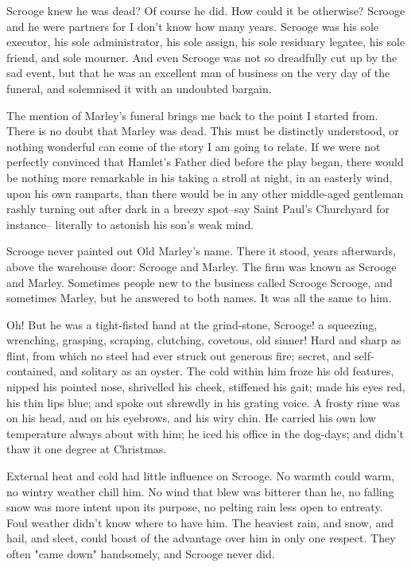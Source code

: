 \documentclass[twocolumn]{article}
\begin{document}
Scrooge knew he was dead? Of course he did.
How could it be otherwise? Scrooge and he were
partners for I don't know how many years. Scrooge
was his sole executor, his sole administrator, his sole
assign, his sole residuary legatee, his sole friend, and
sole mourner. And even Scrooge was not so dreadfully
cut up by the sad event, but that he was an excellent
man of business on the very day of the funeral,
and solemnised it with an undoubted bargain.

The mention of Marley's funeral brings me back to
the point I started from. There is no doubt that Marley
was dead. This must be distinctly understood, or
nothing wonderful can come of the story I am going
to relate. If we were not perfectly convinced that
Hamlet's Father died before the play began, there
would be nothing more remarkable in his taking a
stroll at night, in an easterly wind, upon his own ramparts,
than there would be in any other middle-aged
gentleman rashly turning out after dark in a breezy
spot--say Saint Paul's Churchyard for instance--
literally to astonish his son's weak mind.

Scrooge never painted out Old Marley's name.
There it stood, years afterwards, above the warehouse
door: Scrooge and Marley. The firm was known as
Scrooge and Marley. Sometimes people new to the
business called Scrooge Scrooge, and sometimes Marley,
but he answered to both names. It was all the
same to him.

Oh! But he was a tight-fisted hand at the grind-stone,
Scrooge! a squeezing, wrenching, grasping, scraping,
clutching, covetous, old sinner! Hard and sharp as flint,
from which no steel had ever struck out generous fire;
secret, and self-contained, and solitary as an oyster. The
cold within him froze his old features, nipped his pointed
nose, shrivelled his cheek, stiffened his gait; made his
eyes red, his thin lips blue; and spoke out shrewdly in his
grating voice. A frosty rime was on his head, and on his
eyebrows, and his wiry chin. He carried his own low
temperature always about with him; he iced his office in
the dog-days; and didn't thaw it one degree at Christmas.

External heat and cold had little influence on
Scrooge. No warmth could warm, no wintry weather
chill him. No wind that blew was bitterer than he,
no falling snow was more intent upon its purpose, no
pelting rain less open to entreaty. Foul weather didn't
know where to have him. The heaviest rain, and
snow, and hail, and sleet, could boast of the advantage
over him in only one respect. They often "came down"
handsomely, and Scrooge never did.
\end{document}
